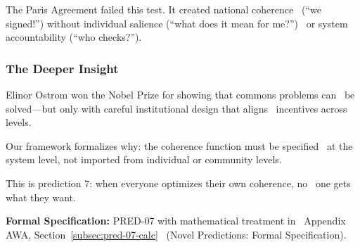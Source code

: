 The Paris Agreement failed this test. It created national coherence \
(``we signed!'') without individual salience (``what does it mean for me?'') \
or system accountability (``who checks?'').

\subsubsection{The Deeper Insight}

Elinor Ostrom won the Nobel Prize for showing that commons problems can \
be solved---but only with careful institutional design that aligns \
incentives across levels.

Our framework formalizes why: the coherence function must be specified \
at the system level, not imported from individual or community levels.

This is prediction 7: when everyone optimizes their own coherence, no \
one gets what they want.

\begin{cross-reference}
\textbf{Formal Specification:} PRED-07 with mathematical treatment in \
Appendix AWA, Section~\ref{subsec:pred-07-calc} \
(Novel Predictions: Formal Specification).
\end{cross-reference}
